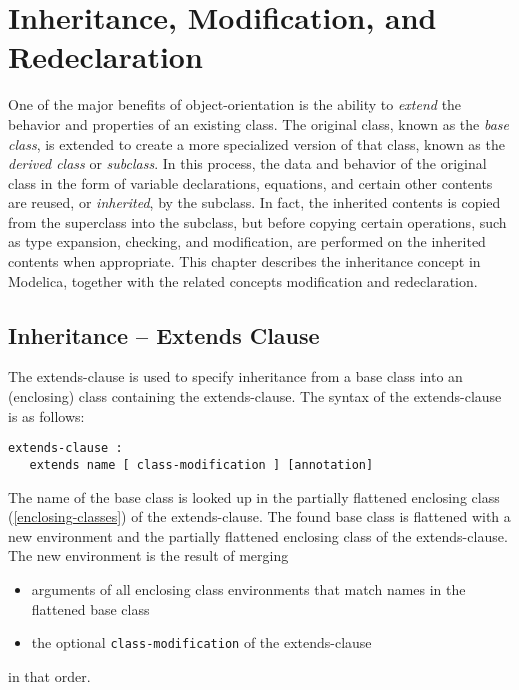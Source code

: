 \chapter{Inheritance, Modification, and Redeclaration}\label{inheritance-modification-and-redeclaration}

One of the major benefits of object-orientation is the ability to
\emph{extend} the behavior and properties of an existing class. The
original class, known as the \emph{base class}, is extended to create a
more specialized version of that class, known as the \emph{derived
class} or \emph{subclass}. In this process, the data and behavior of the
original class in the form of variable declarations, equations, and
certain other contents are reused, or \emph{inherited}, by the subclass.
In fact, the inherited contents is copied from the superclass into the
subclass, but before copying certain operations, such as type expansion,
checking, and modification, are performed on the inherited contents when
appropriate. This chapter describes the inheritance concept in Modelica,
together with the related concepts modification and redeclaration.

\section{Inheritance -- Extends Clause}\label{inheritance-extends-clause}

The extends-clause is used to specify inheritance from a base class into
an (enclosing) class containing the extends-clause. The syntax of the
extends-clause is as follows:
\begin{lstlisting}[language=grammar]
extends-clause :
   extends name [ class-modification ] [annotation]
\end{lstlisting}
The name of the base class is looked up in the partially flattened
enclosing class (\cref{enclosing-classes}) of the extends-clause. The found base
class is flattened with a new environment and the partially flattened
enclosing class of the extends-clause. The new environment is the result
of merging

\begin{itemize}
\item
  arguments of all enclosing class environments that match names in the
  flattened base class
\item
  the optional \lstinline!class-modification! of the extends-clause
\end{itemize}
in that order.

